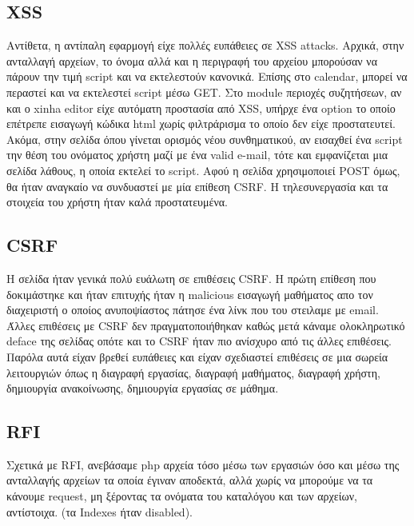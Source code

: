 \documentclass{article}
\begin{document}
\subsection*{\textlatin{XSS}}
Αντίθετα, η αντίπαλη εφαρμογή είχε πολλές ευπάθειες σε \textlatin{XSS attacks}. Aρχικά, στην ανταλλαγή αρχείων, το όνομα αλλά και η περιγραφή του αρχείου μπορούσαν να πάρουν την τιμή \textlatin{script} και να εκτελεστούν κανονικά.
Επίσης στο \textlatin{calendar}, μπορεί να περαστεί και να εκτελεστεί \textlatin{script} μέσω \textlatin{GET}. Στο \textlatin{module} περιοχές συζητήσεων, αν και ο \textlatin{xinha editor} είχε αυτόματη προστασία από \textlatin{XSS}, υπήρχε ένα \textlatin{option} το οποίο επέτρεπε εισαγωγή κώδικα \textlatin{html} χωρίς φιλτράρισμα το οποίο δεν είχε προστατευτεί. Ακόμα, στην σελίδα όπου γίνεται ορισμός νέου συνθηματικού, αν εισαχθεί ένα \textlatin{script} την θέση του ονόματος χρήστη μαζί με ένα \textlatin{valid e-mail}, τότε και εμφανίζεται μια σελίδα λάθους, η οποία εκτελεί το \textlatin{script}. Αφού η σελίδα χρησιμοποιεί \textlatin{POST} όμως, θα ήταν αναγκαίο να συνδυαστεί με μία επίθεση \textlatin{CSRF}. Η τηλεσυνεργασία και τα στοιχεία του χρήστη ήταν καλά προστατευμένα. 

\subsection*{\textlatin{CSRF}}
Η σελίδα ήταν γενικά πολύ ευάλωτη σε επιθέσεις \textlatin{CSRF}. Η πρώτη
επίθεση που δοκιμάστηκε και ήταν επιτυχής ήταν η \textlatin{malicious} εισαγωγή
μαθήματος απο τον διαχειριστή ο οποίος ανυποψίαστος πάτησε ένα λίνκ που του στειλαμε με
\textlatin{email}. Άλλες επιθέσεις με \textlatin{CSRF} δεν πραγματοποιήθηκαν καθώς μετά
κάναμε ολοκληρωτικό \textlatin{deface} της σελίδας οπότε και το \textlatin{CSRF} ήταν πιο
ανίσχυρο από τις άλλες επιθέσεις. Παρόλα αυτά είχαν βρεθεί ευπάθειες και είχαν σχεδιαστεί
επιθέσεις σε μια σωρεία λειτουργιών όπως η διαγραφή εργασίας, διαγραφή μαθήματος, διαγραφή
χρήστη, δημιουργία ανακοίνωσης, δημιουργία εργασίας σε μάθημα.



\subsection*{\textlatin{RFI}}
Σχετικά με \textlatin{RFI}, ανεβάσαμε \textlatin{php} αρχεία τόσο μέσω των εργασιών όσο και μέσω της ανταλλαγής αρχείων τα οποία έγιναν αποδεκτά, αλλά χωρίς να μπορούμε να τα κάνουμε \textlatin{request}, μη ξέροντας τα ονόματα του καταλόγου και των αρχείων, αντίστοιχα. (τα \textlatin{Indexes} ήταν \textlatin{disabled}).
\end{document}
